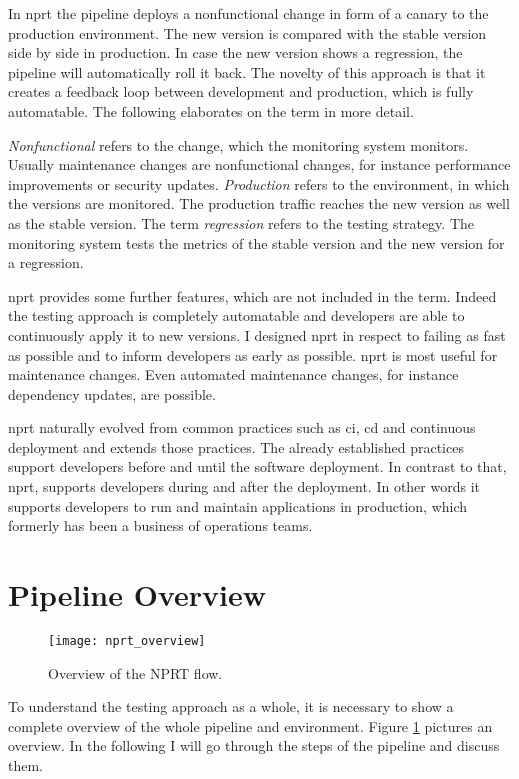 In \gls{nprt} the pipeline deploys a nonfunctional change in form of a canary to the
production environment. The new version is compared with the stable version side by side
in production. In case the new version shows a regression, the pipeline will automatically
roll it back. The novelty of this approach is that it creates a feedback loop between
development and production, which is fully automatable. The following elaborates on the
term in more detail.

\emph{Nonfunctional} refers to the change, which the monitoring system monitors. Usually
maintenance changes are nonfunctional changes, for instance performance improvements or
security updates. \emph{Production} refers to the environment, in which the versions are
monitored. The production traffic reaches the new version as well as the stable
version. The term \emph{regression} refers to the testing strategy. The monitoring system
tests the metrics of the stable version and the new version for a regression.

\gls{nprt} provides some further features, which are not included in the term. Indeed the
testing approach is completely automatable and developers are able to continuously apply
it to new versions. I designed \gls{nprt} in respect to failing as fast as possible and to
inform developers as early as possible. \gls{nprt} is most useful for maintenance
changes. Even automated maintenance changes, for instance dependency updates, are
possible.

\gls{nprt} naturally evolved from common practices such as \gls{ci}, \gls{cd} and
continuous deployment and extends those practices. The already established practices
support developers before and until the software deployment. In contrast to that,
\gls{nprt}, supports developers during and after the deployment. In other words it
supports developers to run and maintain applications in production, which formerly has
been a business of operations teams.

\section{Pipeline Overview}

\begin{figure}[htbp]
  \texttt{[image: nprt\_overview]}
  \caption[nprtflow]{Overview of the NPRT flow.}
  \label{fig:nprt_flow}
\end{figure}

To understand the testing approach as a whole, it is necessary to show a complete overview
of the whole pipeline and environment. Figure \ref{fig:nprt_flow} pictures an overview. In
the following I will go through the steps of the pipeline and discuss them.

